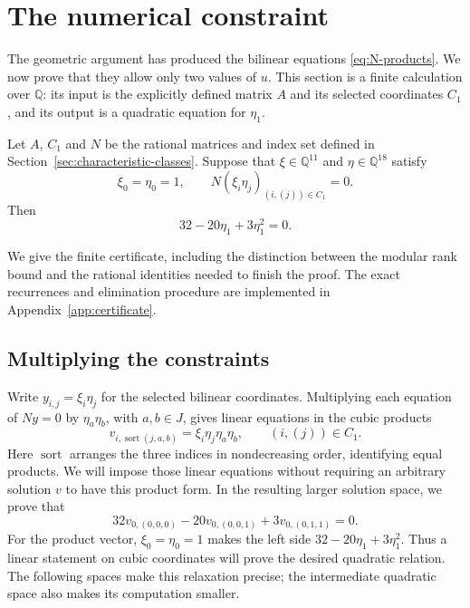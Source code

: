 \section{The numerical constraint}
\label{sec:arithmetic}

The geometric argument has produced the bilinear equations
\eqref{eq:N-products}. We now prove that they allow only two values of
$u$. This section is a finite calculation over $\mathbb Q$: its input
is the explicitly defined matrix $A$ and its selected coordinates
$C_1$, and its output is a quadratic equation for $\eta_1$.

\begin{lemma}\label{lem:finite-ratio}
Let $A$, $C_1$ and $N$ be the rational matrices and index set defined
in Section~\ref{sec:characteristic-classes}. Suppose that
$\xi\in\mathbb Q^{11}$ and $\eta\in\mathbb Q^{18}$ satisfy
\[
 \xi_0=\eta_0=1,
 \qquad N(\xi_i\eta_j)_{(i,(j))\in C_1}=0.
\]
Then
\begin{equation}\label{eq:ratio-quadratic}
 32-20\eta_1+3\eta_1^2=0.
\end{equation}
\end{lemma}

We give the finite certificate, including the distinction between
the modular rank bound and the rational identities needed to finish
the proof. The exact recurrences and elimination procedure are
implemented in Appendix~\ref{app:certificate}.

\subsection{Multiplying the constraints}

Write $y_{i,j}=\xi_i\eta_j$ for the selected bilinear coordinates.
Multiplying each equation of $Ny=0$ by $\eta_a\eta_b$, with
$a,b\in J$, gives linear equations in the cubic products
\[
 v_{i,\operatorname{sort}(j,a,b)}=\xi_i\eta_j\eta_a\eta_b,
 \qquad(i,(j))\in C_1.
\]
Here $\operatorname{sort}$ arranges the three indices in nondecreasing
order, identifying equal products.
We will impose those linear equations without requiring an arbitrary
solution $v$ to have this product form. In the resulting larger
solution space, we prove that
\begin{equation}\label{eq:target-functional}
 32v_{0,(0,0,0)}-20v_{0,(0,0,1)}+3v_{0,(0,1,1)}=0.
\end{equation}
For the product vector, $\xi_0=\eta_0=1$ makes the left side
$32-20\eta_1+3\eta_1^2$. Thus a linear statement on cubic
coordinates will prove the desired quadratic relation. The following
spaces make this relaxation precise; the intermediate quadratic
space also makes its computation smaller.

